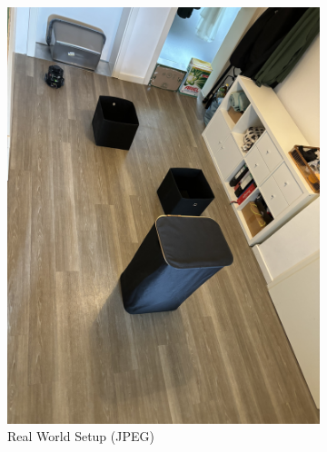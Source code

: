\documentclass[%
paper=A4,               %
twoside=true,           %
openright,              %
11pt,                   %
bibliography=totoc,     %
titlepage=on,           %
DIV=12,                 %
BCOR=1.5cm,             %
parskip=half,            %
final
]{scrreprt}
\begin{document}
			
	\begin{figure}[H]
		\centering
		\begin{subfigure}[b]{0.45\textwidth}
			\centering
			\includegraphics[width=\textwidth]{Graphics/RealWorldSetup.jpeg}
			\caption{Real World Setup (JPEG)}
			\label{fig:fig14}
		\end{subfigure}
		\hfill
		\begin{subfigure}[b]{0.45\textwidth}
			\centering

\end{subfigure}
\end{figure}
\end{document}
